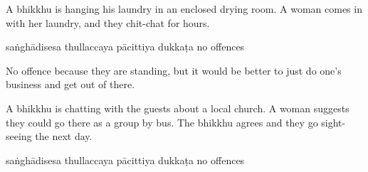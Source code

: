 \begin{exam}{\autoExamName}
\begin{problem*}
\begin{parts}
  \bigskip

\item A bhikkhu is hanging his laundry in an enclosed drying room. A woman comes in with
  her laundry, and they chit-chat for hours.

  \bigskip

  \begin{answers}{5}
    \bChoices
     saṅghādisesa\eAns
     thullaccaya\eAns
     pācittiya\eAns
     dukkaṭa\eAns
     no offences\eAns
    \eChoices
  \end{answers}

  \begin{solution}
    No offence because they are standing, but it would be better to just do
    one's business and get out of there.
  \end{solution}

  \bigskip

\item A bhikkhu is chatting with the guests about a local church. A woman
  suggests they could go there as a group by bus. The bhikkhu agrees and they go
  sight-seeing the next day.

  \bigskip

  \begin{answers}{5}
    \bChoices
     saṅghādisesa\eAns
     thullaccaya\eAns
     pācittiya\eAns
     dukkaṭa\eAns
     no offences\eAns
    \eChoices
  \end{answers}

\end{parts}

\end{problem*}

\end{exam}
